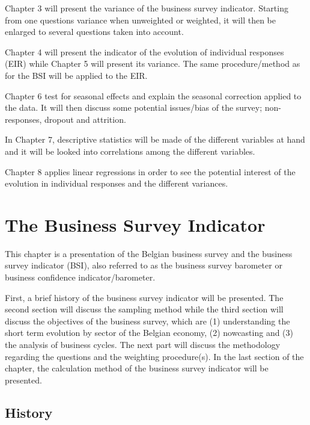 \documentclass[12pt,a4paper,oneside]{book}
\begin{document}
Chapter 3 will present the variance of the business survey indicator. Starting from one questions variance when unweighted or weighted, it will then be enlarged to several questions taken into account.

Chapter 4 will present the indicator of the evolution of individual responses (EIR) while Chapter 5 will present its variance. The same procedure/method as for the BSI will be applied to the EIR.

Chapter 6 test for seasonal effects and explain the seasonal correction applied to the data. It will then discuss some potential issues/bias of the survey; non-responses, dropout and attrition.

In Chapter 7, descriptive statistics will be made of the different variables at hand and it will be looked into correlations among the different variables.

Chapter 8 applies linear regressions in order to see the potential interest of the evolution in individual responses and the different variances.



\chapter{The Business Survey Indicator}

This chapter is a presentation of the Belgian business survey and the business survey indicator (BSI), also referred to as the business survey barometer or business confidence indicator/barometer.

First, a brief history of the business survey indicator will be presented.
The second section will discuss the sampling method while the third section will discuss the objectives of the business survey, which are (1) understanding the short term evolution by sector of the Belgian economy, (2) nowcasting and (3) the analysis of business cycles.
The next part will discuss the methodology regarding the questions and the weighting procedure(s).
In the last section of the chapter, the calculation method of the business survey indicator will be presented.


\section{History}
\end{document}
